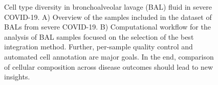 \pagestyle{empty}

\renewcommand{\PATH}{../..}

\newcommand{\rowiIIheight}{.11\textheight}
\newcommand{\rowiIIhjust}{.75}
\newcommand{\rowiIIvjust}{.5}

\renewcommand{\figurename}{Supplementary Figure}
\setcounter{figure}{0}

\begin{figure}
	
	\caption{Cell type diversity in bronchoalveolar lavage (BAL) fluid in severe COVID-19. A) Overview of the samples included in the dataset of BALs from severe COVID-19. B) Computational workflow for the analysis of BAL samples focused on the selection of the best integration method. Further, per-sample quality control and automated cell annotation are major goals. In the end, comparison of cellular composition across disease outcomes should lead to new insights.}
\end{figure}